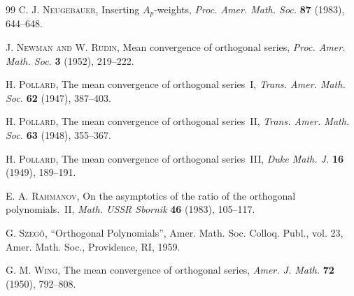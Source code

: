 \documentclass[11pt,a4paper]{article}
\theoremstyle{plain}
\theoremstyle{definition}
\theoremstyle{remark}
\begin{document}
\begin{thebibliography}{99}
\textsc{C. J. Neugebauer}, Inserting $A_{p}$-weights, \textit{Proc. 
Amer. Math. Soc.} \textbf{87} (1983), 644--648.

\textsc{J. Newman and W. Rudin}, Mean convergence of orthogonal 
series, \textit{Proc. Amer. Math. Soc.} \textbf{3} (1952), 219--222.

\textsc{H. Pollard}, The mean convergence of orthogonal series~I,
\textit{Trans. Amer. Math. Soc.} \textbf{62} (1947), 387--403.

\textsc{H. Pollard}, The mean convergence of orthogonal series~II,
\textit{Trans. Amer. Math. Soc.} \textbf{63} (1948), 355--367.

\textsc{H. Pollard}, The mean convergence of orthogonal series~III,
\textit{Duke Math. J.} \textbf{16} (1949), 189--191.

\textsc{E. A. Rahmanov}, On the asymptotics of the ratio of 
the orthogonal polynomials.~II, \textit{Math. USSR Sbornik} \textbf{46} 
(1983), 105--117.

\textsc{G. Szeg\H{o}}, ``Orthogonal Polynomials'', 
Amer. Math. Soc. Colloq. Publ., vol. 23, Amer. Math. Soc., Providence, 
RI, 1959.

\textsc{G. M. Wing}, The mean convergence of orthogonal 
series, \textit{Amer. J. Math.} \textbf{72} (1950), 792--808.

\end{thebibliography}
\end{document}
